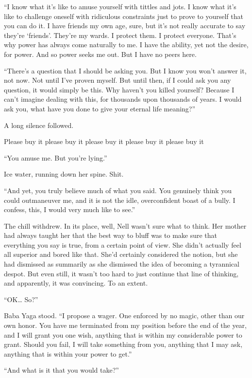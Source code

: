 “I know what it’s like to amuse yourself with tittles and jots. I know what it’s like to challenge oneself with ridiculous constraints just to prove to yourself that you can do it. I have friends my own age, sure, but it’s not really accurate to say they’re ‘friends’. They’re my wards. I protect them. I protect everyone. That’s why power has always come naturally to me. I have the ability, yet not the desire, for power. And so power seeks me out. But I have no peers here.

“There’s a question that I should be asking you. But I know you won’t answer it, not now. Not until I’ve proven myself. But until then, if I could ask you any question, it would simply be this. Why haven’t you killed yourself? Because I can’t imagine dealing with this, for thousands upon thousands of years. I would ask you, what have you done to give your eternal life meaning?”

A long silence followed.

Please buy it please buy it please buy it please buy it please buy it

“You amuse me. But you’re lying.”

Ice water, running down her spine. Shit.

“And yet, you truly believe much of what you said. You genuinely think you could outmaneuver me, and it is not the idle, overconfident boast of a bully. I confess, this, I would very much like to see.”

The chill withdrew. In its place, well, Nell wasn’t sure what to think. Her mother had always taught her that the best way to bluff was to make sure that everything you say is true, from a certain point of view. She didn’t actually feel all superior and bored like that. She’d certainly considered the notion, but she had dismissed as summarily as she dismissed the idea of becoming a tyrannical despot. But even still, it wasn’t too hard to just continue that line of thinking, and apparently, it was convincing. To an extent.

“OK… So?”

Baba Yaga stood. “I propose a wager. One enforced by no magic, other than our own honor. You have me terminated from my position before the end of the year, and I will grant you one wish, anything that is within my considerable power to grant. Should you fail, I will take something from you, anything that I may ask, anything that is within your power to get.”

“And what is it that you would take?”


